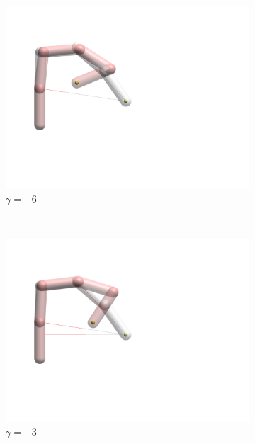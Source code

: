 \begin{figure}[h]
    \centering
    \begin{subfigure}[b]{.3\textwidth}
        \includegraphics[width=\textwidth]{Figures/distortions/distortions-6.png}
        \caption{$\gamma = -6$}
    \end{subfigure}
    ~
    \begin{subfigure}[b]{.3\textwidth}
        \includegraphics[width=\textwidth]{Figures/distortions/distortions-3.png}
        \caption{$\gamma = -3$}
    \end{subfigure}
    ~
    \begin{subfigure}[b]{.3\textwidth}

\end{subfigure}
\end{figure}
